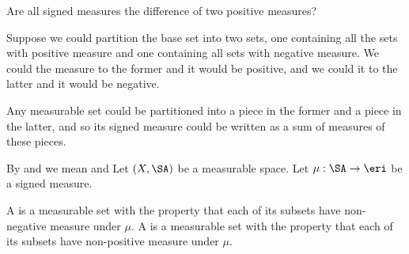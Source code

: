 
\sbasic





































\sstart
{}


Are all signed measures
the difference of two
positive measures?

Suppose we could partition
the base set into two
sets, one containing
all the sets with positive
measure and one containing
all sets with negative measure.
We could
 the measure to
the former and it would
be positive, and we could
 it to the latter
and it would be negative.

Any measurable set could be partitioned
into a piece in the former and a
piece in the latter, and so
its signed measure could be
written as a sum of measures
of these pieces.


By  and
we mean 
and 
Let $(X, \SA)$ be
a measurable space.
Let $\mu: \SA \to \eri$
be a signed measure.

A 
is a measurable set
with the property that
each of its subsets have
non-negative measure
under $\mu$.
A 
is a measurable set
with the property that
each of its subsets have
non-positive measure
under $\mu$.

